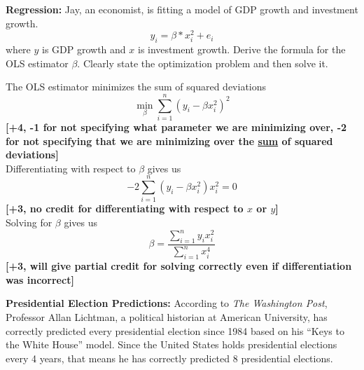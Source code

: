 \documentclass[addpoints,12pt]{exam}
\begin{document}
\begin{questions}
		
		\question[10] \textbf{Regression:} Jay, an economist, is fitting a model of GDP growth and investment growth. 
					$$
					y_i = \beta * x_i^2 + e_i
					$$
					where $y$ is GDP growth and $x$ is investment growth. 
					Derive the formula for the OLS estimator $\beta$. Clearly state the optimization problem and then solve it.
					\begin{solution}
						The OLS estimator minimizes the sum of squared deviations 
						$$
						\min_\beta \sum_{i = 1}^n (y_i - \beta x_i^2)^2
						$$
						\textbf{[+4, -1 for not specifying what parameter we are minimizing over, -2 for not specifying that we are minimizing over the \underline{sum} of squared deviations]}\\
						Differentiating with respect to $\beta$ gives us 
						$$
						-2\sum_{i = 1}^n (y_i - \beta x_i^2) x_i^2 = 0
						$$
						\textbf{[+3, no credit for differentiating with respect to $x$ or $y$]}\\
						Solving for $\beta$ gives us 
						$$
						\beta = \frac{\sum_{i = 1}^n y_i x_i^2}{\sum_{i = 1}^n x_i^4}
						$$
						\textbf{[+3, will give partial credit for solving correctly even if differentiation was incorrect]}
					\end{solution}
		\question \textbf{Presidential Election Predictions:} According to \textit{The Washington Post}, Professor Allan Lichtman, a political historian at American University, has correctly predicted every presidential election since 1984 based on his ``Keys to the White House'' model. Since the United States holds presidential elections every 4 years, that means he has correctly predicted 8 presidential elections.
		\begin{parts}

\end{parts}
\end{questions}
\end{document}
